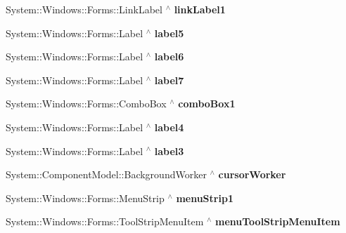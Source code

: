\begin{DoxyCompactItemize}
System\+::\+Windows\+::\+Forms\+::\+Link\+Label $^\wedge$ {\bfseries link\+Label1}
\item 
\mbox{\label{class_gaze_track_g_u_i_1_1_g_u_i_a7ef30281d076c58970199ecc578b8edc}} 
System\+::\+Windows\+::\+Forms\+::\+Label $^\wedge$ {\bfseries label5}
\item 
\mbox{\label{class_gaze_track_g_u_i_1_1_g_u_i_a4e58bb70e3c74a322a86014507edef88}} 
System\+::\+Windows\+::\+Forms\+::\+Label $^\wedge$ {\bfseries label6}
\item 
\mbox{\label{class_gaze_track_g_u_i_1_1_g_u_i_a5d57362d58ad6542f5cfa202d2592abe}} 
System\+::\+Windows\+::\+Forms\+::\+Label $^\wedge$ {\bfseries label7}
\item 
\mbox{\label{class_gaze_track_g_u_i_1_1_g_u_i_a76d7d68a7c317a482640aa8e895ab378}} 
System\+::\+Windows\+::\+Forms\+::\+Combo\+Box $^\wedge$ {\bfseries combo\+Box1}
\item 
\mbox{\label{class_gaze_track_g_u_i_1_1_g_u_i_a1b521c3abc05cb2d7f36bf9049da4a6a}} 
System\+::\+Windows\+::\+Forms\+::\+Label $^\wedge$ {\bfseries label4}
\item 
\mbox{\label{class_gaze_track_g_u_i_1_1_g_u_i_a3430d6b9d658746cd244294d9a1b65be}} 
System\+::\+Windows\+::\+Forms\+::\+Label $^\wedge$ {\bfseries label3}
\item 
\mbox{\label{class_gaze_track_g_u_i_1_1_g_u_i_a24f8fcb15898662838375550a94acfe5}} 
System\+::\+Component\+Model\+::\+Background\+Worker $^\wedge$ {\bfseries cursor\+Worker}
\item 
\mbox{\label{class_gaze_track_g_u_i_1_1_g_u_i_a85144ffe832955a5c6466c74376b2b69}} 
System\+::\+Windows\+::\+Forms\+::\+Menu\+Strip $^\wedge$ {\bfseries menu\+Strip1}
\item 
\mbox{\label{class_gaze_track_g_u_i_1_1_g_u_i_aa8eb9343a18af7fed6c95ceff637b217}} 
System\+::\+Windows\+::\+Forms\+::\+Tool\+Strip\+Menu\+Item $^\wedge$ {\bfseries menu\+Tool\+Strip\+Menu\+Item}

\end{DoxyCompactItemize}
